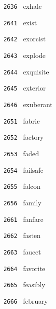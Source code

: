 \documentclass[11pt]{article}
\begin{document}
\begin{multicols}{6}
\noindent \texttt{ 2636 } exhale  \par
\noindent \texttt{ 2641 } exist  \par
\noindent \texttt{ 2642 } exorcist  \par
\noindent \texttt{ 2643 } explode  \par
\noindent \texttt{ 2644 } exquisite  \par
\noindent \texttt{ 2645 } exterior  \par
\noindent \texttt{ 2646 } exuberant  \par
\noindent \texttt{ 2651 } fabric  \par
\noindent \texttt{ 2652 } factory  \par
\noindent \texttt{ 2653 } faded  \par
\noindent \texttt{ 2654 } failsafe  \par
\noindent \texttt{ 2655 } falcon  \par
\noindent \texttt{ 2656 } family  \par
\noindent \texttt{ 2661 } fanfare  \par
\noindent \texttt{ 2662 } fasten  \par
\noindent \texttt{ 2663 } faucet  \par
\noindent \texttt{ 2664 } favorite  \par
\noindent \texttt{ 2665 } feasibly  \par
\noindent \texttt{ 2666 } february  \par
\end{multicols}
\end{document}
